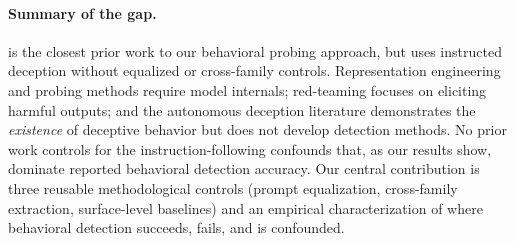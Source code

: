 \paragraph{Summary of the gap.} \citet{pacchiardi2023catch} is the closest prior work to our behavioral probing approach, but uses instructed deception without equalized or cross-family controls. Representation engineering and probing methods \cite{zou2023representation, burns2022discovering, azaria2023internal, li2024inference} require model internals; red-teaming \cite{ganguli2022red, perez2022red} focuses on eliciting harmful outputs; and the autonomous deception literature \cite{scheurer2024strategic, greenblatt2024alignment, denison2024sycophancy} demonstrates the \emph{existence} of deceptive behavior but does not develop detection methods. No prior work controls for the instruction-following confounds that, as our results show, dominate reported behavioral detection accuracy. Our central contribution is three reusable methodological controls (prompt equalization, cross-family extraction, surface-level baselines) and an empirical characterization of where behavioral detection succeeds, fails, and is confounded.